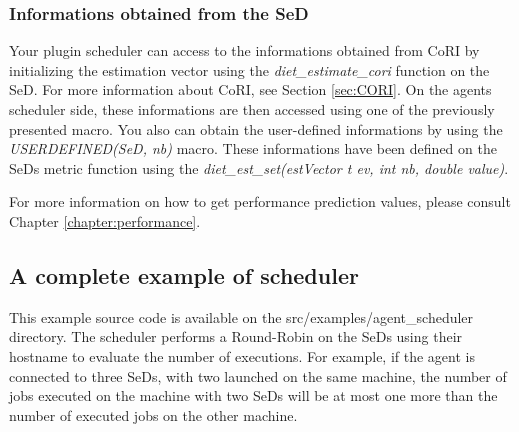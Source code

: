 \subsubsection{Informations obtained from the SeD}
Your plugin scheduler can access to the informations obtained from CoRI
by initializing the estimation vector using the \textit{diet\_estimate\_cori}
function on the SeD. For more information about CoRI, see Section
\ref{sec:CORI}. On the agents scheduler side, these informations are then
accessed using one of the previously presented macro.
You also can obtain the user-defined informations by using the
\textit{USERDEFINED(SeD, nb)} macro. These informations have been defined
on the SeDs metric function using the \textit{diet\_est\_set(estVector t ev,
int nb, double value)}.

For more information on how to get performance prediction values, please
consult Chapter \ref{chapter:performance}.

\subsection{A complete example of scheduler}
This example source code is available on the src/examples/agent\_scheduler
directory. The scheduler performs a Round-Robin on the SeDs using their
hostname to evaluate the number of executions. For example, if the agent
is connected to three SeDs, with two launched on the same machine, the
number of jobs executed on the machine with two SeDs will be at most one
more than the number of executed jobs on the other machine.

